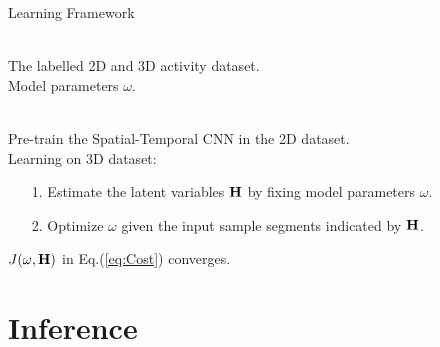 \documentclass{sig-alternate}
\newcommand{\INPUT}{\item[\myinput]}
\newcommand{\myinput}{\textbf{Initialization:}}
\newcommand{\MYWHILE}{\item[\mywhile]}
\newcommand{\mywhile}{\textbf{repeat}}
\newcommand{\MYENDWHILE}{\item[\myendwhile]}
\newcommand{\myendwhile}{\textbf{until}}
\begin{document}
\begin{small}
\begin{algorithm}[htb]
\caption{Learning Framework}
\label{alg:Framwork}
\begin{algorithmic}\footnotesize
\REQUIRE ~~\\
    The labelled 2D and 3D activity dataset.
\ENSURE ~~\\
    Model parameters $\omega$.

\INPUT ~~\\
    Pre-train the Spatial-Temporal CNN in the 2D dataset.
    \\
\vspace{0.5em}
\hspace{-1.5em} Learning on 3D dataset:
\MYWHILE
    \STATE
    \begin{itemize}
\setlength{\itemsep}{1pt}
 \setlength{\parskip}{0pt}
 \setlength{\parsep}{10pt}
      \item[1.] Estimate the latent variables ${\bf{H}}$ by fixing model parameters $\omega$.
      \item[2.] Optimize $\omega$ given the input sample segments indicated by ${\bf{H}}$.
    \end{itemize}
\MYENDWHILE{$J(\omega,{\bf{H}})$ in Eq.(\ref{eq:Cost}) converges. }

\end{algorithmic}
\end{algorithm}
\end{small}

\section{Inference}
%
\end{document}
